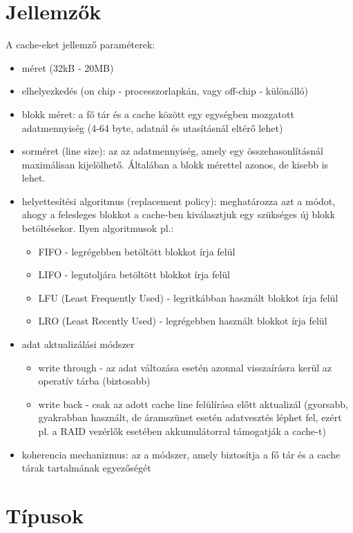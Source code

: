 \section{Jellemzők}
A cache-eket jellemző paraméterek:
\begin{itemize}
    \item méret (32kB - 20MB)
    \item elhelyezkedés (on chip - processzorlapkán, vagy off-chip - különálló)
    \item blokk méret: a fő tár és a cache között egy egységben mozgatott adatmennyiség (4-64 byte, adatnál és utasításnál eltérő lehet)
    \item sorméret (line size): az az adatmennyiség, amely egy összehasonlításnál maximálisan kijelölhető. Általában a blokk mérettel azonos, de kisebb is lehet.
    \item helyettesítési algoritmus (replacement policy): meghatározza azt a módot, ahogy a felesleges blokkot a cache-ben kiválasztjuk egy szükséges új blokk betöltésekor. Ilyen algoritmusok pl.:
    \begin{itemize}
        \item FIFO - legrégebben betöltött blokkot írja felül
        \item LIFO - legutoljára betöltött blokkot írja felül
        \item LFU (Least Frequently Used) - legritkábban használt blokkot írja felül
        \item LRO (Least Recently Used) - legrégebben használt blokkot írja felül
    \end{itemize}
    \item adat aktualizálási módszer
    \begin{itemize}
        \item write through - az adat változása esetén azonnal visszaírásra kerül az operatív tárba (biztosabb)
        \item write back - csak az adott cache line felülírása előtt aktualizál (gyorsabb, gyakrabban használt, de áramszünet esetén adatvesztés léphet fel, ezért pl. a RAID vezérlők esetében akkumulátorral támogatják a cache-t)
    \end{itemize}
    \item koherencia mechanizmus: az a módszer, amely biztosítja a fő tár és a cache tárak tartalmának egyezőségét
\end{itemize}

\section{Típusok}

